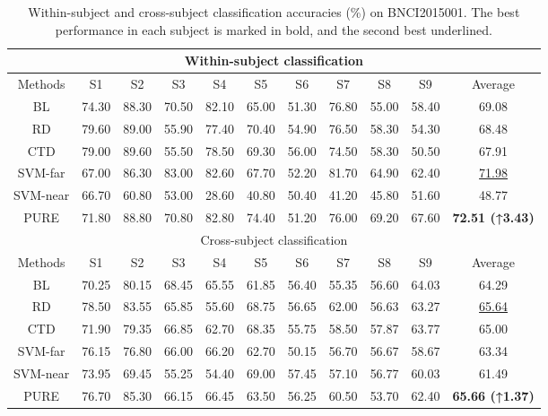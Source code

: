 \documentclass[journal,twocolumn]{IEEEtran}
\begin{document}
\begin{table}[htpb] \centering
  \caption{Within-subject and cross-subject classification accuracies (\%) on BNCI2015001. The best performance in each subject is marked in bold, and the second best underlined.}
  \label{tab:2015001-result}
  \begin{tabular}{c|c|c|c|c|c|c|c|c|c|c}
  \toprule
  \multicolumn{11}{c}{Within-subject classification} \\
  \midrule
  Methods & S1 & S2 & S3 & S4 & S5 & S6 & S7 & S8 & S9 & Average \\
  \midrule
  BL & 74.30 & 88.30 & 70.50 & 82.10 & 65.00 & 51.30 & 76.80 & 55.00 & 58.40 & 69.08 \\
  RD & 79.60 & 89.00 & 55.90 & 77.40 & 70.40 & 54.90 & 76.50 & 58.30 & 54.30 & 68.48 \\
  CTD & 79.00 & 89.60 & 55.50 & 78.50 & 69.30 & 56.00 & 74.50 & 58.30 & 50.50 & 67.91 \\
  SVM-far & 67.00 & 86.30 & 83.00 & 82.60 & 67.70 & 52.20 & 81.70 & 64.90 & 62.40 & \underline{71.98} \\
  SVM-near & 66.70 & 60.80 & 53.00 & 28.60 & 40.80 & 50.40 & 41.20 & 45.80 & 51.60 & 48.77 \\
  PURE & 71.80 & 88.80 & 70.80 & 82.80 & 74.40 & 51.20 & 76.00 & 69.20 & 67.60 & \textbf{72.51 (↑3.43)} \\
  \midrule
  \multicolumn{11}{c}{Cross-subject classification} \\
  \midrule
  Methods & S1 & S2 & S3 & S4 & S5 & S6 & S7 & S8 & S9 & Average \\
  \midrule
  BL & 70.25 & 80.15 & 68.45 & 65.55 & 61.85 & 56.40 & 55.35 & 56.60 & 64.03 & 64.29 \\
  RD & 78.50 & 83.55 & 65.85 & 55.60 & 68.75 & 56.65 & 62.00 & 56.63 & 63.27 & \underline{65.64} \\
  CTD & 71.90 & 79.35 & 66.85 & 62.70 & 68.35 & 55.75 & 58.50 & 57.87 & 63.77 & 65.00 \\
  SVM-far & 76.15 & 76.80 & 66.00 & 66.20 & 62.70 & 50.15 & 56.70 & 56.67 & 58.67 & 63.34 \\
  SVM-near & 73.95 & 69.45 & 55.25 & 54.40 & 69.00 & 57.45 & 57.10 & 56.77 & 60.03 & 61.49 \\
  PURE & 76.70 & 85.30 & 66.15 & 66.45 & 63.50 & 56.25 & 60.50 & 53.70 & 62.40 & \textbf{65.66 (↑1.37)} \\
  \bottomrule
  \end{tabular}
\end{table}
\end{document}
